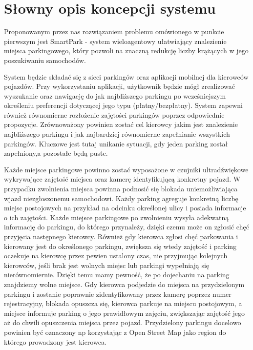\newpage
\section{Słowny opis koncepcji systemu}

Proponowanym przez nas rozwiązaniem problemu omówionego w punkcie pierwszym jest SmartPark - system wieloagentowy ułatwiający znalezienie miejsca parkingowego, który pozwoli na znaczną redukcję liczby krążących w jego poszukiwaniu samochodów.

System będzie składać się z sieci parkingów oraz aplikacji mobilnej dla kierowców pojazdów. Przy wykorzystaniu aplikacji, użytkownik będzie mógł zrealizować wyszukanie oraz nawigację do jak najbliższego parkingu po wcześniejszym określeniu preferencji dotyczącej jego typu (płatny/bezpłatny).  System zapewni również równomierne rozłożenie zajętości parkingów poprzez odpowiednie propozycje. Zrównoważony powinien zostać cel kierowcy jakim jest znalezienie najbliższego parkingu i jak najbardziej równomierne zapełnianie wszystkich parkingów. Kluczowe jest tutaj unikanie sytuacji, gdy  jeden parking został zapełniony,a pozostałe będą puste.

Każde miejsce parkingowe powinno zostać wyposażone w czujniki ultradźwiękowe wykrywające zajętość miejsca oraz kamerę identyfikującą konkretny pojazd. W przypadku zwolnienia miejsca powinna podnosić się blokada uniemożliwiająca wjazd niezgłoszonemu samochodowi. Każdy parking agreguje konkretną liczbę miejsc postojowych na przykład na odcinku określonej ulicy i posiada informacje o ich zajętości. Każde miejsce parkingowe po zwolnieniu wysyła adekwatną informację do parkingu, do którego przynależy, dzięki czemu może on zgłosić chęć przyjęcia następnego kierowcy. Również gdy kierowca zgłosi chęć parkowania i kierowany jest do określonego parkingu, zwiększa się wtedy zajętość i parking oczekuje na kierowcę przez pewien ustalony czas, nie przyjmując kolejnych kierowców, jeśli brak jest wolnych miejsc lub parkingi wypełniają się nierównomiernie. Dzięki temu mamy pewność, że po dojechaniu na parking znajdziemy wolne miejsce. Gdy kierowca podjedzie do miejsca na przydzielonym parkingu i zostanie poprawnie zidentyfikowany przez kamerę poprzez numer rejestracyjny, blokada opuszcza się, kierowca parkuje na miejscu postojowym, a miejsce informuje parking o jego prawidłowym zajęciu, zwiększając zajętość jego aż do chwili opuszczenia miejsca przez pojazd. Przydzielony parkingu docelowo powinien być oznaczony np korzystając z Open Street Map jako region do którego prowadzony jest kierowca.

